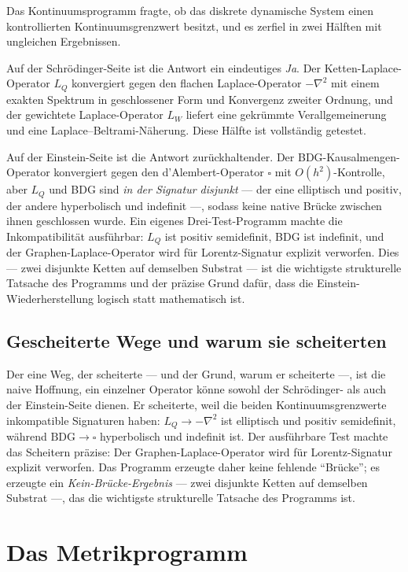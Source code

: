 \documentclass[10pt,twoside,openany]{book}
\begin{document}
Das Kontinuumsprogramm fragte, ob das diskrete dynamische System einen kontrollierten
Kontinuumsgrenzwert besitzt, und es zerfiel in zwei Hälften mit ungleichen Ergebnissen.

Auf der Schr\"odinger-Seite ist die Antwort ein eindeutiges \emph{Ja}. Der
Ketten-Laplace-Operator $L_Q$ konvergiert gegen den flachen Laplace-Operator $-\nabla^2$
mit einem exakten Spektrum in geschlossener Form und Konvergenz zweiter Ordnung, und der
gewichtete Laplace-Operator $L_W$ liefert eine gekrümmte Verallgemeinerung und eine
Laplace--Beltrami-Näherung. Diese Hälfte ist vollständig getestet.

Auf der Einstein-Seite ist die Antwort zurückhaltender. Der BDG-Kausalmengen-Operator
konvergiert gegen den d'Alembert-Operator $\square$ mit $O(h^2)$-Kontrolle, aber $L_Q$
und BDG sind \emph{in der Signatur disjunkt} --- der eine elliptisch und positiv, der
andere hyperbolisch und indefinit ---, sodass keine native Brücke zwischen ihnen
geschlossen wurde. Ein eigenes Drei-Test-Programm machte die Inkompatibilität ausführbar:
$L_Q$ ist positiv semidefinit, BDG ist indefinit, und der Graphen-Laplace-Operator wird
für Lorentz-Signatur explizit verworfen. Dies --- zwei disjunkte Ketten auf demselben
Substrat --- ist die wichtigste strukturelle Tatsache des Programms und der präzise Grund
dafür, dass die Einstein-Wiederherstellung logisch statt mathematisch ist.

\subsection{Gescheiterte Wege und warum sie scheiterten}

Der eine Weg, der scheiterte --- und der Grund, warum er scheiterte ---, ist die naive
Hoffnung, ein einzelner Operator könne sowohl der Schr\"odinger- als auch der
Einstein-Seite dienen. Er scheiterte, weil die beiden Kontinuumsgrenzwerte inkompatible
Signaturen haben: $L_Q\to-\nabla^2$ ist elliptisch und positiv semidefinit, während
$\mathrm{BDG}\to\square$ hyperbolisch und indefinit ist. Der ausführbare Test machte das
Scheitern präzise: Der Graphen-Laplace-Operator wird für Lorentz-Signatur explizit
verworfen. Das Programm erzeugte daher keine fehlende ``Brücke''; es erzeugte ein
\emph{Kein-Brücke-Ergebnis} --- zwei disjunkte Ketten auf demselben Substrat ---, das die
wichtigste strukturelle Tatsache des Programms ist.

\section{Das Metrikprogramm}
\end{document}
